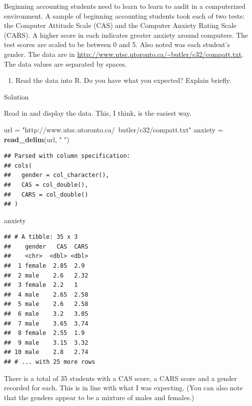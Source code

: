 \documentclass[]{tufte-book}
\newenvironment{Shaded}{}{}
\newcommand{\KeywordTok}[1]{\textcolor[rgb]{0.00,0.44,0.13}{\textbf{#1}}}
\newcommand{\NormalTok}[1]{#1}
\newcommand{\StringTok}[1]{\textcolor[rgb]{0.25,0.44,0.63}{#1}}
\providecommand{\tightlist}{%
  \setlength{\itemsep}{0pt}\setlength{\parskip}{0pt}}
\theoremstyle{definition}
\theoremstyle{definition}
\theoremstyle{definition}
\theoremstyle{remark}
\begin{document}
Beginning accounting students need to learn to learn to audit in a
computerized environment. A sample of beginning accounting students took
each of two tests: the Computer Attitude Scale (CAS) and the Computer
Anxiety Rating Scale (CARS). A higher score in each indicates greater
anxiety around computers. The test scores are scaled to be between 0 and
5. Also noted was each student's gender. The data are in
\url{http://www.utsc.utoronto.ca/~butler/c32/compatt.txt}. The data
values are separated by spaces.

\begin{enumerate}
\def\labelenumi{(\alph{enumi})}
\tightlist
\item
  Read the data into R. Do you have what you expected? Explain briefly.
\end{enumerate}

Solution

Read in and display the data. This, I think, is the easiest way.

\begin{Shaded}
\begin{Highlighting}[]
\NormalTok{url =}\StringTok{ "http://www.utsc.utoronto.ca/~butler/c32/compatt.txt"}
\NormalTok{anxiety =}\StringTok{ }\KeywordTok{read_delim}\NormalTok{(url, }\StringTok{" "}\NormalTok{)}
\end{Highlighting}
\end{Shaded}

\begin{verbatim}
## Parsed with column specification:
## cols(
##   gender = col_character(),
##   CAS = col_double(),
##   CARS = col_double()
## )
\end{verbatim}

\begin{Shaded}
\begin{Highlighting}[]
\NormalTok{anxiety}
\end{Highlighting}
\end{Shaded}

\begin{verbatim}
## # A tibble: 35 x 3
##    gender   CAS  CARS
##    <chr>  <dbl> <dbl>
##  1 female  2.85  2.9 
##  2 male    2.6   2.32
##  3 female  2.2   1   
##  4 male    2.65  2.58
##  5 male    2.6   2.58
##  6 male    3.2   3.05
##  7 male    3.65  3.74
##  8 female  2.55  1.9 
##  9 male    3.15  3.32
## 10 male    2.8   2.74
## # ... with 25 more rows
\end{verbatim}

There is a total of 35 students with a CAS score, a CARS score and a
gender recorded for each. This is in line with what I was expecting.
(You can also note that the genders appear to be a mixture of males and
females.)
\end{document}
